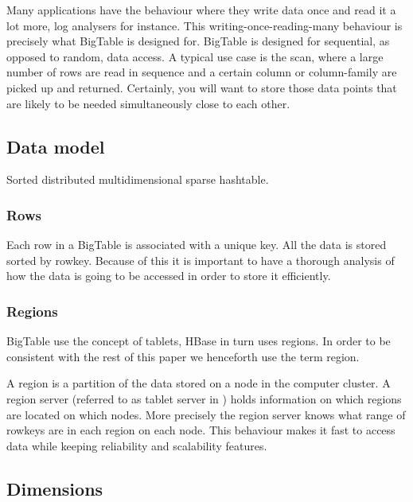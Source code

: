 \documentclass[a4paper,10pt]{book}
\begin{document}
Many applications have the behaviour where they write data once and read it
a lot more, log analysers for instance. This writing-once-reading-many
behaviour is precisely what BigTable is designed for. BigTable is designed
for sequential, as opposed to random, data access. A typical use case is
the scan, where a large number of rows are read in sequence and a certain
column or column-family are picked up and returned. Certainly, you will
want to store those data points that are likely to be needed simultaneously
close to each other. \cite{bigtable}


\subsection{Data model}

Sorted distributed multidimensional sparse hashtable.


\subsubsection*{Rows}

Each row in a BigTable is associated with a unique key. All the data is
stored sorted by rowkey. Because of this it is important to have a thorough
analysis of how the data is going to be accessed in order to store it
efficiently.



\subsubsection*{Regions}

BigTable use the concept of tablets, HBase in turn uses regions. In order
to be consistent with the rest of this paper we henceforth use the term
region.

A region is a partition of the data stored on a node in the computer
cluster. A region server (referred to as tablet server in \cite{bigtable})
holds information on which regions are located on which nodes. More
precisely the region server knows what range of rowkeys are in each region
on each node. This behaviour makes it fast to access data while keeping
reliability and scalability features.


\subsection*{Dimensions}
\end{document}
